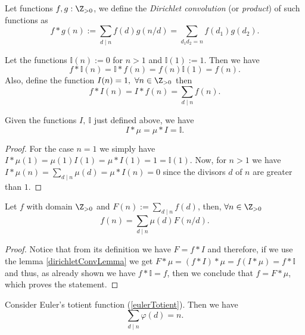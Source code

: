 \begin{definition}
   Let functions \(f, g : \Z_{>0}\), we define the \emph{Dirichlet
   convolution} (or \emph{product}) of such functions as
   \[
      f \ast g(n) := \sum_{d\mid n} f(d) g(n/d) = \sum_{d_1d_2=n} f(d_1)g(d_2).
   \]
\end{definition}

Let the functions \(\mathbb{I}(n) := 0\) for \(n > 1\) and  \(\mathbb{I}(1) :=
1\). Then we have
\[
   f \ast \mathbb{I}(n) = \mathbb{I} \ast f(n) = f(n)\mathbb{I}(1) = f(n).
\]
Also, define the function \(I(n) = 1,\ \forall  n \in \Z_{>0}\) then
\[
   f \ast I(n) = I \ast f(n) = \sum_{d \mid n} f(n).
\]

\begin{lemma}\label{dirichletConvLemma}
   Given the functions \(I,\ \mathbb{I}\) just defined above, we have
   \[
      I \ast \mu = \mu \ast I = \mathbb{I}.
   \]
\end{lemma}

\begin{proof}
   For the case \(n = 1\) we simply have  \(I \ast \mu(1) = \mu(1) I(1) = \mu
   \ast I(1) = 1 = \mathbb{I}(1)\). Now, for \(n > 1\) we have  \(I \ast \mu(n)
   = \sum_{d \mid n} \mu(d) = \mu \ast I(n) = 0\) since the divisors \(d\) of
   \(n\) are greater than \(1\).
\end{proof}

\begin{theorem}\label{mobiusInversion}
   Let \(f\) with domain  \(\Z_{>0}\) and \(F(n) := \sum_{d \mid n}
   f(d)\), then, \(\forall n \in \Z_{>0}\)
   \[
      f(n) = \sum_{d\mid n} \mu(d) F(n/d).
   \]
\end{theorem}

\begin{proof}
   Notice that from its definition we have \(F = f \ast I\) and therefore, if we
   use the lemma \ref{dirichletConvLemma} we get \(F \ast \mu = (f \ast I) \ast
   \mu = f (I \ast \mu) = f \ast \mathbb{I}\) and thus, as already shown we have
   \(f \ast \mathbb{I} = f\), then we conclude that  \(f = F \ast \mu\), which
   proves the statement.
\end{proof}

\begin{proposition}
   Consider Euler's totient function (\ref{eulerTotient}). Then we have
   \[
       \sum_{d \mid n} \varphi(d) = n.
   \]
\end{proposition}

